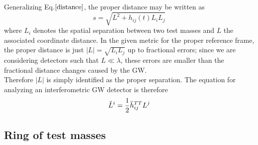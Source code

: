 \documentclass[binding=0.6cm, LaM]{sapthesis}
\begin{document}
        Generalizing Eq.$\ref{distance}$, the proper distance may be written as
                \begin{equation}
                	s = \sqrt{L^2 + h_{ij}(t)L_{i}L_{j}}
                \end{equation}
        where $L_i$ denotes the spatial separation between two test masses and $L$ the associated coordinate distance.
        In the given metric for the proper reference frame, the proper distance is just $|L| = \sqrt{L_iL_j}$ up to fractional errors;
        since we are considering detectors such that
        $L \ll \lambda$, these errors are smaller than the fractional distance changes caused by the GW. \\
        Therefore $|L|$ is simply identified as the proper separation. The equation for analyzing an interferometric GW detector is therefore
                \begin{equation}
                	{\ddot L}^i = {1 \over 2}{\ddot h}_{ij}^{TT}L^j
                \end{equation}

\subsection{Ring of test masses}
\end{document}
